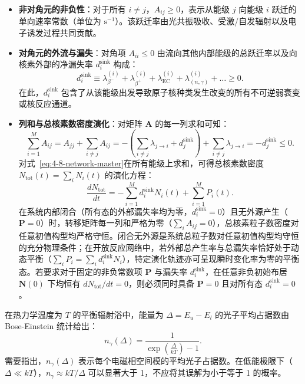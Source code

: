 \begin{itemize}
\item \textbf{非对角元的非负性}：对于所有 $i \ne j$，$A_{ij} \ge 0$，表示从能级 $j$ 向能级 $i$ 跃迁的单向速率常数（单位为 $\mathrm{s}^{-1}$）。该跃迁率由光共振吸收、受激/自发辐射以及电子诱发过程共同贡献。
\item \textbf{对角元的外流与漏失}：对角项 $A_{ii} \le 0$ 由流向其他内部能级的总跃迁率以及向核素外部的净漏失率 $d_i^{\mathrm{sink}}$ 构成：
\begin{equation}\label{eq:4-8-sink-def}
d_i^{\mathrm{sink}} \equiv \lambda_{\beta^-}^{(i)} + \lambda_{\beta^+}^{(i)} + \lambda_{\mathrm{EC}}^{(i)} + \lambda_{(n,\gamma)}^{(i)} + \dots \ge 0.
\end{equation}
在此，$d_i^{\mathrm{sink}}$ 包含了从该能级出发导致原子核种类发生改变的所有不可逆弱衰变或核反应通道。
\item \textbf{列和与总核素数密度演化}：对矩阵 $\mathbf{A}$ 的每一列求和可知：
\begin{equation}\label{eq:4-8-column-sum}
\sum_{i=1}^M A_{ij} = A_{jj} + \sum_{i \ne j} A_{ij} = -\left(\sum_{i \ne j} \lambda_{j \to i} + d_j^{\mathrm{sink}}\right) + \sum_{i \ne j} \lambda_{j \to i} = -d_j^{\mathrm{sink}} \le 0.
\end{equation}
对式~\eqref{eq:4-8-network-master}在所有能级上求和，可得总核素数密度 $N_{\mathrm{tot}}(t) = \sum_i N_i(t)$ 的演化方程：
\begin{equation}\label{eq:4-8-total-pop-rate}
\frac{d N_{\mathrm{tot}}}{dt} = -\sum_{i=1}^M d_i^{\mathrm{sink}} N_i(t) + \sum_{i=1}^M P_i(t).
\end{equation}
在系统内部闭合（所有态的外部漏失率均为零，$d_i^{\mathrm{sink}} = 0$）且无外源产生（$\mathbf{P} = 0$）时，转移矩阵每一列和严格为零（$\sum_i A_{ij} = 0$），总核素粒子数密度对任意初值构型均严格守恒。闭合无外源是系统总粒子数对任意初值构型均守恒的充分物理条件；在开放反应网络中，若外部总产生率与总漏失率恰好处于动态平衡（$\sum_i P_i = \sum_i d_i^{\mathrm{sink}} N_i$），特定演化轨迹亦可呈现瞬时变化率为零的平衡态。若要求对于固定的非负常数项 $\mathbf{P}$ 与漏失率 $d_i^{\mathrm{sink}}$，在任意非负初始布居 $\mathbf{N}(0)$ 下均恒有 $d N_{\mathrm{tot}}/dt = 0$，则必须同时具备 $\mathbf{P} = 0$ 且对所有态 $d_i^{\mathrm{sink}} = 0$。
\end{itemize}

在热力学温度为 $T$ 的平衡辐射浴中，能量为 $\Delta = E_u - E_l$ 的光子平均占据数由 Bose-Einstein 统计给出：
\begin{equation}\label{eq:4-8-planck-dist}
n_\gamma(\Delta) = \frac{1}{\exp\left(\frac{\Delta}{kT}\right) - 1}.
\end{equation}
需要指出，$n_\gamma(\Delta)$ 表示每个电磁相空间模的平均光子占据数。在低能极限下（$\Delta \ll kT$），$n_\gamma \approx kT/\Delta$ 可以显著大于 1，不应将其误解为小于等于 1 的概率。

